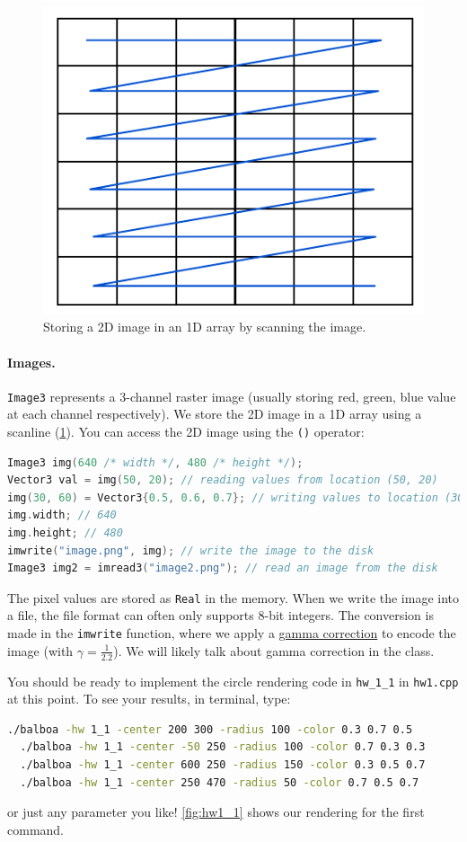 \begin{figure}[h]
    \centering
    \includegraphics[width=0.4\linewidth]{imgs/scanline.pdf}
    \caption{Storing a 2D image in an 1D array by scanning the image.}
    \label{fig:scanline}
\end{figure}

\paragraph{Images.} \lstinline{Image3} represents a 3-channel raster image (usually storing red, green, blue value at each channel respectively). We store the 2D image in a 1D array using a scanline (\cref{fig:scanline}). You can access the 2D image using the \lstinline{()} operator:
\begin{lstlisting}[language=C++]
Image3 img(640 /* width */, 480 /* height */);
Vector3 val = img(50, 20); // reading values from location (50, 20)
img(30, 60) = Vector3{0.5, 0.6, 0.7}; // writing values to location (30, 60)
img.width; // 640
img.height; // 480
imwrite("image.png", img); // write the image to the disk
Image3 img2 = imread3("image2.png"); // read an image from the disk
\end{lstlisting}
The pixel values are stored as \lstinline{Real} in the memory. When we write the image into a file, the file format can often only supports 8-bit integers. The conversion is made in the \lstinline{imwrite} function, where we apply a \href{https://en.wikipedia.org/wiki/Gamma_correction}{gamma correction} to encode the image (with $\gamma=\frac{1}{2.2}$). We will likely talk about gamma correction in the class.

You should be ready to implement the circle rendering code in \lstinline{hw_1_1} in \lstinline{hw1.cpp} at this point. 
To see your results, in terminal, type:
\begin{lstlisting}[language=bash]
  ./balboa -hw 1_1 -center 200 300 -radius 100 -color 0.3 0.7 0.5
  ./balboa -hw 1_1 -center -50 250 -radius 100 -color 0.7 0.3 0.3
  ./balboa -hw 1_1 -center 600 250 -radius 150 -color 0.3 0.5 0.7
  ./balboa -hw 1_1 -center 250 470 -radius 50 -color 0.7 0.5 0.7
\end{lstlisting}
or just any parameter you like! \cref{fig:hw1_1} shows our rendering for the first command.

